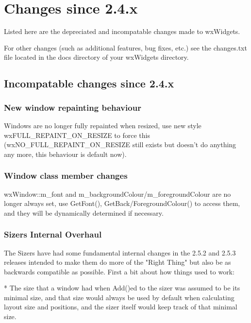 \section{Changes since 2.4.x}\label{changes}

Listed here are the depreciated and incompatable changes made to wxWidgets.

For other changes (such as additional features, bug fixes, etc.) see the changes.txt file located in the docs directory of your wxWidgets directory.

\subsection{Incompatable changes since 2.4.x}

\subsubsection{New window repainting behaviour}

Windows are no longer fully repainted when resized, use new style wxFULL\_REPAINT\_ON\_RESIZE to force this (wxNO\_FULL\_REPAINT\_ON\_RESIZE still exists but doesn't do anything any more, this behaviour is default now).

\subsubsection{Window class member changes}

wxWindow::m\_font and m\_backgroundColour/m\_foregroundColour are no longer always set, use GetFont(), GetBack/ForegroundColour() to access them, and they will be dynamically determined if necessary.

\subsubsection{Sizers Internal Overhaul}

The Sizers have had some fundamental internal changes in the 2.5.2 and 2.5.3 releases intended to make them do more of the "Right Thing" but also be as backwards compatible as possible.  First a bit about how things used to work:

    * The size that a window had when Add()ed to the sizer was assumed
      to be its minimal size, and that size would always be used by
      default when calculating layout size and positions, and the
      sizer itself would keep track of that minimal size.

